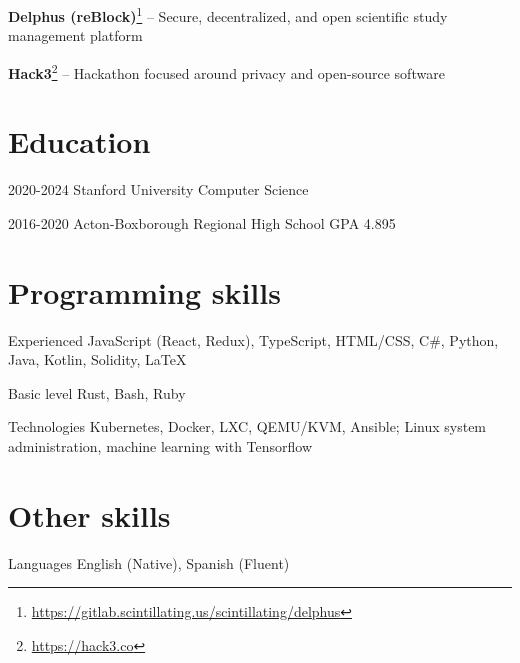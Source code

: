 \documentclass[paper=letter]{tccv}
\begin{document}
\textbf{Delphus (reBlock)}\footnote{\url{https://gitlab.scintillating.us/scintillating/delphus}} -- Secure, decentralized, and open scientific study management platform

\textbf{Hack3}\footnote{\url{https://hack3.co}} -- Hackathon focused around privacy and open-source software

\textbf{}

\section{Education}

\begin{yearlist}
     \item{2020-2024}
          {Stanford University}
          {Computer Science}
     \item{2016-2020}
          {Acton-Boxborough Regional High School}
          {GPA 4.895}
\end{yearlist}

\section{Programming skills}

\begin{factlist}

\item{Experienced}
     {JavaScript (React, Redux), TypeScript, HTML/CSS, C\#, Python, Java, Kotlin, Solidity, \LaTeX}

\item{Basic level}
     {Rust, Bash, Ruby}

\item{Technologies}
     {Kubernetes, Docker, LXC, QEMU/KVM, Ansible; Linux system administration, machine learning with Tensorflow}

\end{factlist}

\section{Other skills}

\begin{factlist}

     \item{Languages}
          {English (Native), Spanish (Fluent)}
     
\end{factlist}
\end{document}
